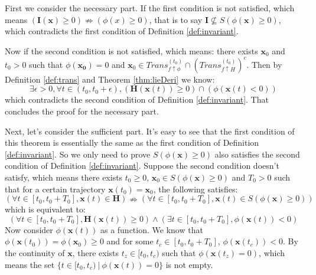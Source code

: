 \documentclass{article}
\begin{document}
\begin{Proof}
First we consider the necessary part. If the first condition is not satisfied, which means $(\boldsymbol{I}(\boldsymbol{x}) \geq 0) \nRightarrow (\phi(x) \geq 0)$, that is to say $\boldsymbol{I} \not\subseteq S(\phi(\boldsymbol{x}) \geq 0)$, which contradicts the first condition of Definition \ref{def:invariant}.

Now if the second condition is not satisfied, which means: there exists $\boldsymbol{x}_0$ and $t_0 > 0$ such that $\phi(\boldsymbol{x_0}) = 0$ and $\boldsymbol{x}_0 \in Trans_{f \uparrow \phi}^{(t_0)} \cap (Trans_{f \uparrow H}^{(t_0)})^c$. Then by Definition \ref{def:trans} and Theorem \ref{thm:lieDeri} we know: 
\begin{equation*}
		\exists \epsilon > 0, \forall t \in (t_0, t_0 + \epsilon), (\boldsymbol{H}(\boldsymbol{x}(t)) \geq 0) \cap (\phi(\boldsymbol{x}(t) < 0))
\end{equation*}
which contradicts the second condition of Definition \ref{def:invariant}. That concludes the proof for the necessary part.

Next, let's consider the sufficient part. It's easy to see that the first condition of this theorem is essentially the same as the first condition of Definition \ref{def:invariant}. So we only need to prove $S(\phi(\boldsymbol{x}) \geq 0)$ also satisfies the second condition of Definition \ref{def:invariant}. Suppose the second condition doesn't satisfy, which means there exists $t_0 \geq 0$, $\boldsymbol{x}_0 \in S(\phi(\boldsymbol{x}) \geq 0)$ and $T_0 > 0$ such that for a certain trajectory $\boldsymbol{x}(t_0) = \boldsymbol{x}_0$, the following satisfies: 
	\begin{equation*}
		(\forall t \in [t_0, t_0 + T_0], \boldsymbol{x}(t) \in \boldsymbol{H}) \nRightarrow (\forall t \in [t_0, t_0 + T_0], \boldsymbol{x}(t) \in S(\phi(\boldsymbol{x}) \geq 0))
	\end{equation*}
which is equivalent to: 
	\begin{equation*}
		(\forall t \in [t_0, t_0 + T_0], \boldsymbol{H}(\boldsymbol{x}(t)) \geq 0) \wedge (\exists t \in [t_0, t_0 + T_0], \phi(\boldsymbol{x}(t)) < 0)
	\end{equation*}
Now consider $\phi(\boldsymbol{x}(t))$ as a function. We know that $\phi(\boldsymbol{x}(t_0)) = \phi(\boldsymbol{x}_0) \geq 0$ and for some $t_c \in [t_0, t_0 + T_0]$, $\phi(\boldsymbol{x}(t_c)) < 0$. By the continuity of $\boldsymbol{x}$, there exists $t_z \in [t_0, t_c)$ such that $\phi(\boldsymbol{x}(t_z) = 0)$, which means the set $\{ t \in [t_0, t_c)\ |\ \phi(\boldsymbol{x}(t)) = 0 \}$ is not empty.


\end{Proof}
\end{document}
